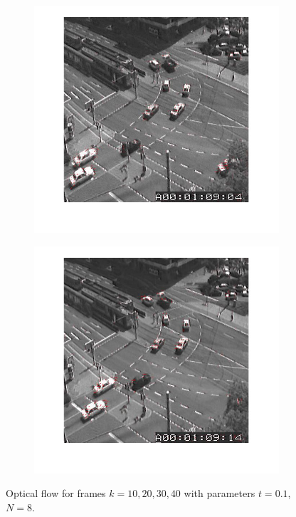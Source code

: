 \documentclass[a4paper]{iacas}
\begin{document}
\begin{figure}[!htbp]
	\begin{subfigure}[b]{0.4\textwidth}
		\includegraphics[width=\textwidth]{409.jpg}
		\caption{}
		\label{fig:409}
	\end{subfigure}
	\begin{subfigure}[b]{0.4\textwidth}
		\includegraphics[width=\textwidth]{410.jpg}
		\caption{}
		\label{fig:410}
	\end{subfigure}
	
	\caption{Optical flow for frames $k=10, 20, 30,40$ with parameters $t=0.1$, $N=8$.}
	\label{fig:400b}
\end{figure}
\end{document}

